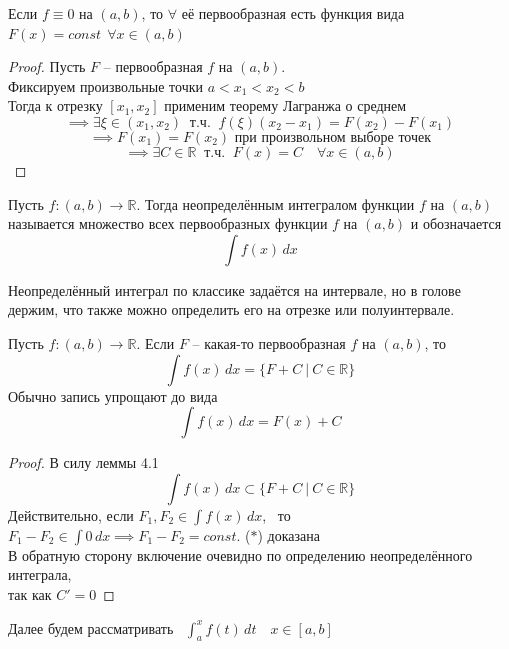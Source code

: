 \documentclass[11pt]{article}
\begin{document}
\begin{lemma}
  Если $f \equiv 0$ на $(a, b)$, то $\forall$ её первообразная есть функция 
  вида $F(x) = const \ \ \forall x \in (a, b)$
\end{lemma}

\begin{proof}
  Пусть $F$ -- первообразная $f$ на $(a, b)$. \\ 
  Фиксируем произвольные точки $a < x_1 < x_2 < b$ \\
  Тогда к отрезку $[x_1, x_2]$ применим теорему Лагранжа о среднем
  \[\implies \exists \xi \in (x_1, x_2) \ \text{ т.ч. } \ 
  f(\xi)(x_2 - x_1) = F(x_2) - F(x_1)\]
  \[\implies F(x_1) = F(x_2) \text{ при произвольном выборе точек}\]
  \[\implies \exists C \in \mathbb{R} \ \text{ т.ч. } \ F(x) = C \quad 
  \forall x \in (a, b)\]
\end{proof}

\begin{definition}
  Пусть $f \colon (a, b) \to \mathbb{R}$. Тогда неопределённым интегралом 
  функции $f$ на $(a, b)$ называется множество всех первообразных функции 
  $f$ на $(a, b)$ и обозначается \[\int f(x)\,dx\]
\end{definition}

\begin{remark}
  Неопределённый интеграл по классике задаётся на интервале, но в голове 
  держим, что также можно определить его на отрезке или полуинтервале. 
\end{remark}

\begin{theorem}
  Пусть $f \colon (a, b) \to \mathbb{R}$. Если $F$ -- какая-то первообразная 
  $f$ на $(a, b)$, то \[\int f(x)\,dx = \{F + C \ | \ C \in \mathbb{R}\}\]
  Обычно запись упрощают до вида \[\int f(x)\,dx = F(x) + C\]
\end{theorem}

\begin{proof}
  В силу леммы 4.1 \[\int f(x)\,dx \subset \{F + C \ | \ C \in 
  \mathbb{R}\} \tag{$\ast$}\]
  Действительно, если $F_1, F_2 \in \displaystyle \int f(x)\,dx$, \ то \ 
  $F_1 - F_2 \in \displaystyle \int 0\,dx \implies F_1 - F_2 = const$. 
  ($\ast$) доказана \\
  В обратную сторону включение очевидно по определению неопределённого 
  интеграла, \\ так как $C' = 0$ 
\end{proof}

\begin{remark}
  Далее будем рассматривать \ $\displaystyle \int_{a}^{x} f(t)\,dt 
  \quad x \in [a, b]$
\end{remark}
\end{document}
